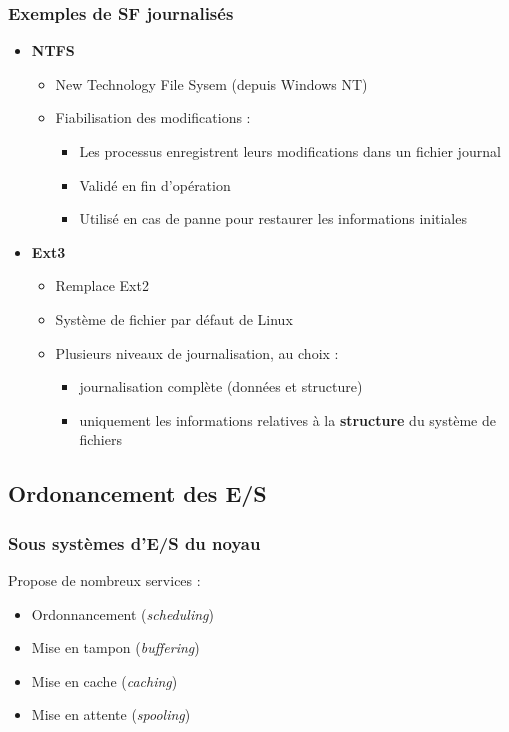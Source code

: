 \begin{frame}
\frametitle{Exemples de SF journalisés}
\begin{itemize}
\item \textbf{NTFS}
\begin{itemize}
\item New Technology File Sysem (depuis Windows NT)
\item Fiabilisation des modifications :
\begin{itemize}
\item Les processus enregistrent leurs modifications dans un fichier journal
\item Validé en fin d'opération
\item Utilisé en cas de panne pour restaurer les informations initiales
\end{itemize}
\end{itemize}
\item \textbf{Ext3}
\begin{itemize}
\item Remplace Ext2
\item Système de fichier par défaut de Linux
\item Plusieurs niveaux de journalisation, au choix :
\begin{itemize}
\item journalisation complète (données et structure)
\item uniquement les informations relatives à la \textbf{structure} du système de fichiers
\end{itemize}
\end{itemize}
\end{itemize}
\end{frame}


\subsection{Ordonancement des E/S}

\begin{frame}
\frametitle{Sous systèmes d'E/S du noyau}
Propose de nombreux services :
\begin{itemize}
\item Ordonnancement (\textit{scheduling})
\item Mise en tampon (\textit{buffering})
\item Mise en cache (\textit{caching})
\item Mise en attente (\textit{spooling})
\end{itemize}
\end{frame}

